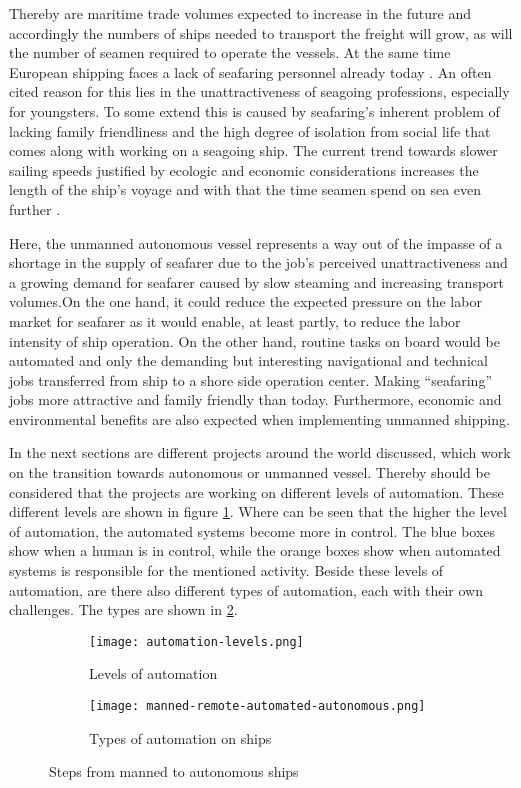 Thereby are maritime trade volumes expected to increase in the future and accordingly the numbers of ships needed to transport the freight will grow, as will the number of seamen required to operate the vessels. At the same time European shipping faces a lack of seafaring personnel already today \cite{Cahoon2014}. An often cited reason for this lies in the unattractiveness of seagoing professions, especially for youngsters. To some extend this is caused by seafaring’s inherent problem of lacking family friendliness and the high degree of isolation from social life that comes along with working on a seagoing ship. The current trend towards slower sailing speeds justified by ecologic and economic considerations increases the length of the ship’s voyage and with that the time seamen spend on sea even further \cite{Finnsgard2018}.

Here, the unmanned autonomous vessel represents a way out of the impasse of a shortage in the supply of seafarer due to the job’s perceived unattractiveness and a growing demand for seafarer caused by slow steaming and increasing transport volumes.On the one hand, it could reduce the expected pressure on the labor market for seafarer as it would enable, at least partly, to reduce the labor intensity of ship operation. On the other hand, routine tasks on board would be automated and only the demanding but interesting navigational and technical jobs transferred from ship to a shore side operation center. Making “seafaring” jobs more attractive and family friendly than today. Furthermore, economic and environmental benefits are also expected when implementing unmanned shipping. \cite{MUNIN2016}

In the next sections are different projects around the world discussed, which work on the transition towards autonomous or unmanned vessel. Thereby should be considered that the projects are working on different levels of automation. These different levels are shown in figure \ref{fig:automation-levels}. Where can be seen that the higher the level of automation, the automated systems become more in control. The blue boxes show when a human is in control, while the orange boxes show when automated systems is responsible for the mentioned activity. 
Beside these levels of automation, are there also different types of automation, each with their own challenges. The types are shown in \ref{fig:manned-remote-autonomous}.

\begin{figure}[hb]
	\begin{subfigure}[b]{0.55\linewidth}
		\centering
		\texttt{[image: automation-levels.png]}
		\caption{Levels of automation}
		\label{fig:automation-levels}
	\end{subfigure} 
	\begin{subfigure}[b]{0.4\linewidth}
		\centering
		\texttt{[image: manned-remote-automated-autonomous.png]}
		\caption{Types of automation on ships}
		\label{fig:manned-remote-autonomous}
	\end{subfigure}
	\caption{Steps from manned to autonomous ships}
	\label{fig:automation} 
\end{figure}


